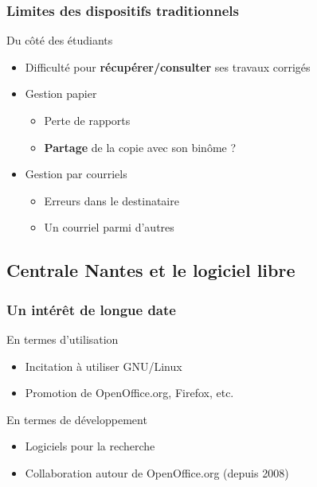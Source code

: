 \documentclass[svgnames,hyperref, english, xcolor=dvipsnames,usenames]{beamer}		        %
\begin{document}
\frame
{
        \frametitle{Limites des dispositifs traditionnels}

        \begin{alertblock}{Du côté des étudiants}
                \begin{itemize}
                        \item Difficulté pour \textbf{récupérer/consulter} ses travaux corrigés
                        \item Gestion papier
                                \begin{itemize}
                                        \item Perte de rapports
                                        \item \textbf{Partage} de la copie avec son binôme ?
                                \end{itemize}
                        \item Gestion par courriels
                                \begin{itemize}
                                        \item Erreurs dans le destinataire
                                        \item Un courriel parmi d'autres
                                \end{itemize}
                \end{itemize}
        \end{alertblock}
}

\subsection*{Centrale Nantes et le logiciel libre}

\frame
{
        \frametitle{Un intérêt de longue date}

        \begin{block}{En termes d'utilisation}
                \begin{itemize}
                        \item Incitation à utiliser GNU/Linux
                        \item Promotion de OpenOffice.org, Firefox, etc.
                \end{itemize}
        \end{block}

        \begin{block}{En termes de développement}
                \begin{itemize}
                        \item Logiciels pour la recherche
                        \item Collaboration autour de OpenOffice.org (depuis 2008)
                \end{itemize}
        \end{block}
}
\end{document}
